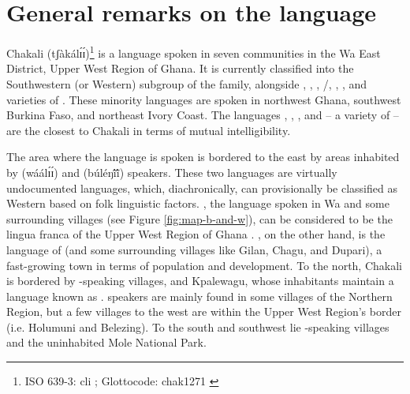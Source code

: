 \label{sec:intro}



\chapter{General remarks on the language}
\label{sec:background}

Chakali  ({\sls tʃàkálɪ́ɪ́})\footnote{ISO 639-3: cli  \citep{lewi16}; Glottocode: chak1271 \citep{glot16}} is a language  spoken in seven communities in the Wa East District, Upper West Region of Ghana.   It is currently classified  into the  Southwestern (or Western) subgroup of the  family, alongside , , , /, , , and varieties of  \citep{lewi14, glot16}. These minority languages are spoken in northwest Ghana, southwest Burkina Faso,  and northeast Ivory Coast.  The languages  , , , and   -- a variety of   --  are the closest to Chakali in terms of mutual intelligibility.


The area where the language is spoken  is bordered to the east  by areas inhabited by  ({\sls wáálɪ́ɪ́}) and  ({\sls búléŋĩ́ĩ́}) speakers. These two languages are virtually undocumented languages, which,   diachronically, can provisionally be classified as Western   based on folk linguistic factors. , the language spoken in Wa and some surrounding villages (see Figure \ref{fig:map-b-and-w}), can be considered to be the lingua franca of the Upper West Region of Ghana  \citep{brin15d}. , on the other hand, is the language of  (and some surrounding villages like Gilan, Chagu, and Dupari), a fast-growing town in terms of population and development. To the north, Chakali is bordered by -speaking villages, and Kpalewagu, whose inhabitants maintain a  language known as .  speakers are mainly found in some villages of the Northern Region, but a few villages to the west are within the Upper West Region's border (i.e. Holumuni and Belezing).  To the south and southwest lie -speaking villages and the uninhabited Mole National Park.


